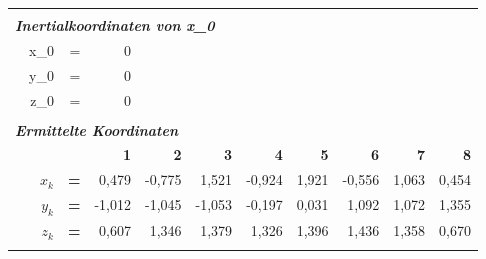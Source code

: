 \begin{table}[h]
\begin{tabular}{r|rrr|r|r|r|r|rrr}
    \multicolumn{1}{r}{} &       &       & \multicolumn{1}{r}{} & \multicolumn{1}{r}{} & \multicolumn{1}{r}{} & \multicolumn{1}{r}{} & \multicolumn{1}{r}{} &       &       &  \\
    \multicolumn{11}{l}{\textit{\textbf{Inertialkoordinaten von x\_0}}} \\
    \multicolumn{1}{r}{} & x\_0  & =     & \multicolumn{1}{r}{0} & \multicolumn{1}{r}{} & \multicolumn{1}{r}{} & \multicolumn{1}{r}{} & \multicolumn{1}{r}{} &       &       &  \\
    \multicolumn{1}{r}{} & y\_0  & =     & \multicolumn{1}{r}{0} & \multicolumn{1}{r}{} & \multicolumn{1}{r}{} & \multicolumn{1}{r}{} & \multicolumn{1}{r}{} &       &       &  \\
    \multicolumn{1}{r}{} & z\_0  & =     & \multicolumn{1}{r}{0} & \multicolumn{1}{r}{} & \multicolumn{1}{r}{} & \multicolumn{1}{r}{} & \multicolumn{1}{r}{} &       &       &  \\
    \multicolumn{1}{r}{} &       &       & \multicolumn{1}{r}{} & \multicolumn{1}{r}{} & \multicolumn{1}{r}{} & \multicolumn{1}{r}{} & \multicolumn{1}{r}{} &       &       &  \\
    \multicolumn{11}{l}{\textit{\textbf{Ermittelte Koordinaten}}} \\
    \multicolumn{1}{r}{\textit{\textbf{}}} &       &       & \multicolumn{1}{r}{\textbf{1}} & \multicolumn{1}{r}{\textbf{2}} & \multicolumn{1}{r}{\textbf{3}} & \multicolumn{1}{r}{\textbf{4}} & \multicolumn{1}{r}{\textbf{5}} & \textbf{6} & \textbf{7} & \textbf{8} \\
\cline{2-11}    \multicolumn{1}{r}{} & ${x_k}$ & \textbf{=} & \multicolumn{1}{r}{0,479} & \multicolumn{1}{r}{-0,775} & \multicolumn{1}{r}{1,521} & \multicolumn{1}{r}{-0,924} & \multicolumn{1}{r}{1,921} & -0,556 & 1,063 & 0,454 \\
    \multicolumn{1}{r}{} & ${y_k}$ & \textbf{=} & \multicolumn{1}{r}{-1,012} & \multicolumn{1}{r}{-1,045} & \multicolumn{1}{r}{-1,053} & \multicolumn{1}{r}{-0,197} & \multicolumn{1}{r}{0,031} & 1,092 & 1,072 & 1,355 \\
    \multicolumn{1}{r}{} & ${z_k}$ & \textbf{=} & \multicolumn{1}{r}{0,607} & \multicolumn{1}{r}{1,346} & \multicolumn{1}{r}{1,379} & \multicolumn{1}{r}{1,326} & \multicolumn{1}{r}{1,396} & 1,436 & 1,358 & 0,670 \\
    \multicolumn{1}{r}{} &       &       & \multicolumn{1}{r}{} & \multicolumn{1}{r}{} & \multicolumn{1}{r}{} & \multicolumn{1}{r}{} & \multicolumn{1}{r}{} &       &       &  \\


\end{tabular}
\end{table}
